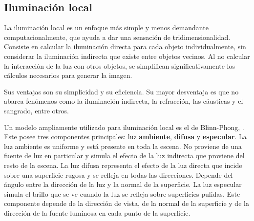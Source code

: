 \subsection{Iluminación local}

La iluminación local es un enfoque más simple y menos demandante computacionalmente, que ayuda a dar una sensación de tridimensionalidad.
Consiste en calcular la iluminación directa para cada objeto individualmente, sin considerar la iluminación indirecta que existe entre objetos vecinos.
Al no calcular la interacción de la luz con otros objetos, se simplifican significativamente los cálculos necesarios para generar la imagen.

Sus ventajas son su simplicidad y su eficiencia.
Su mayor desventaja es que no abarca fenómenos como la iluminación indirecta, la refracción, las cáusticas y el sangrado, entre otros.

Un modelo ampliamente utilizado para iluminación local es el de Blinn-Phong, \cite{blinn-phong}.
Este posee tres componentes principales: luz \textbf{ambiente}, \textbf{difusa} y \textbf{especular}.
La luz ambiente es uniforme y está presente en toda la escena.
No proviene de una fuente de luz en particular y simula el efecto de la luz indirecta que proviene del resto de la escena.
La luz difusa representa el efecto de la luz directa que incide sobre una superficie rugosa y se refleja en todas las direcciones.
Depende del ángulo entre la dirección de la luz y la normal de la superficie.
La luz especular simula el brillo que se ve cuando la luz se refleja sobre superficies pulidas.
Este componente depende de la dirección de vista, de la normal de la superficie y de la dirección de la fuente luminosa en cada punto de la superficie.


